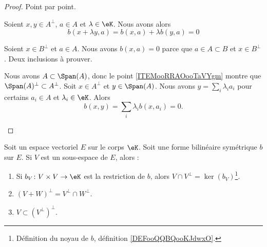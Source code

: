 \begin{proof}
	Point par point.
	\begin{subproof}

		Soient \( x,y\in A^{\perp}\), \( a\in A\) et \( \lambda\in \eK\). Nous avons alors
		\begin{equation}
			b(x+\lambda y,a)=b(x,a)+\lambda b(y,a)=0
		\end{equation}


		Soient \( x\in B^{\perp}\) et \( a\in A\). Nous avons \( b(x,a)=0\) parce que \( a\in A\subset B\) et \( x\in B^{\perp}\).
		Deux inclusions à prouver.

		\begin{subproof}
			Nous avons \( A\subset \Span(A)\), donc le point \ref{ITEMooRRAOooTaVYgm} montre que \( \Span(A)^{\perp}\subset A^{\perp}\).
			Soit \( x\in A^{\perp}\) et \( y\in\Span(A)\). Nous avons \( y=\sum_i\lambda_ia_i\) pour certains \( a_i\in A\) et \( \lambda_i\in \eK\). Alors
			\begin{equation}
				b(x,y)=\sum_i\lambda_ib(x,a_i)=0.
			\end{equation}
		\end{subproof}
	\end{subproof}
\end{proof}



\begin{proposition}		\label{PROPooSACFooQTsiJL}
	Soit un espace vectoriel \( E\) sur le corps \( \eK\). Soit une forme bilinéaire symétrique \( b\) sur \( E\). Si \( V\) est un sous-espace de \( E\), alors :
	\begin{enumerate}
		\item		\label{ITEMooYHJUooQnbKQc}
		      Si \(b_V \colon V\times V\to \eK  \) est la restriction de \( b\), alors \(  V\cap V^{\perp}=\ker(b_V)\)\footnote{Définition du noyau de \( b\), définition \ref{DEFooQQBQooKJdwxO}.}.
		\item		\label{ITEMooUZZFooDbuddF}
		      \( (V+W)^{\perp}=V^{\perp}\cap W^{\perp}\).
		\item	\label{ITEMooSZAGooLgkzYw}
		      \( V\subset (V^{\perp})^{\perp}\).
	\end{enumerate}
\end{proposition}


